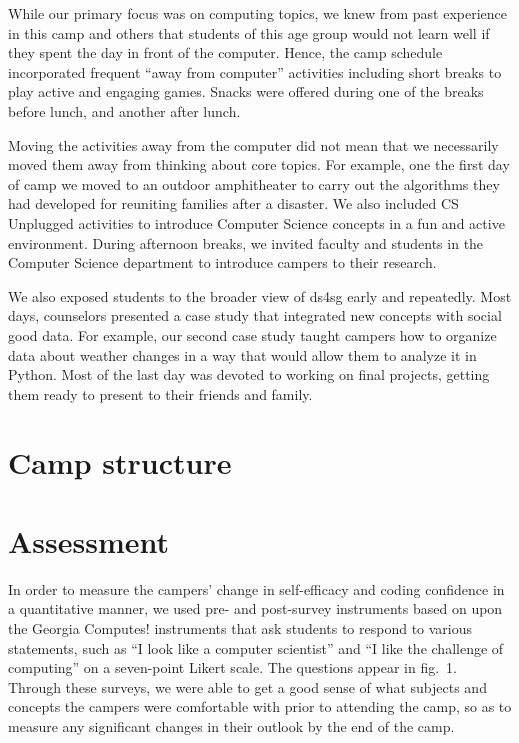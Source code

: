 While our primary focus was on computing topics, we knew from past
experience in this camp and others that students of this age group
would not learn well if they spent the day in front of the computer.
Hence, the camp schedule incorporated frequent ``away from computer''
activities including short breaks to play active and engaging games.
Snacks were offered during one of the breaks before lunch, and
another after lunch.

Moving the activities away from the computer did not mean that we
necessarily moved them away from thinking about core topics.  For
example, one the first day of camp we moved to an outdoor amphitheater
to carry out the algorithms they had developed for reuniting families
after a disaster.  We also included CS Unplugged \cite{csunplugged}
activities to introduce Computer Science concepts in a fun and
active environment.  During afternoon breaks, we invited faculty
and students in the Computer Science department to introduce campers
to their research.  

We also exposed students to the broader view of ds4sg early and
repeatedly.  Most days, counselors presented a case study that
integrated new concepts with social good data. For example, our
second case study taught campers how to organize data about weather
changes in a way that would allow them to analyze it in Python.
Most of the last day was devoted to working on final projects,
getting them ready to present to their friends and family.

\section{Camp structure}

\section{Assessment}

In order to measure the campers' change in self-efficacy and coding
confidence in a quantitative manner, we used pre- and post-survey
instruments based on upon the Georgia Computes! instruments
\cite{Bruckman2009} that ask students to respond to various statements,
such as ``I look like a computer scientist'' and ``I like the
challenge of computing'' on a seven-point Likert scale.  The questions
appear in fig.~1.  Through these surveys, we were able to get a
good sense of what subjects and concepts the campers were comfortable
with prior to attending the camp, so as to measure any significant
changes in their outlook by the end of the camp.  

